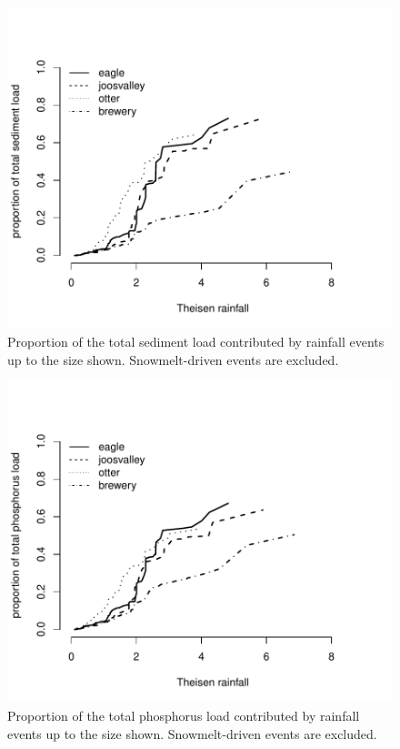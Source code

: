 \documentclass[12pt]{article}
\begin{document}


\begin{figure}
    \begin{center}
\includegraphics{loadings-figure2}
    \end{center}
    \caption{Proportion of the total sediment load contributed by rainfall events up to the size shown. Snowmelt-driven events are excluded.\label{cdf-p}}
\end{figure}

\begin{figure}
    \begin{center}
\includegraphics{loadings-figure3}
    \end{center}
    \caption{Proportion of the total phosphorus load contributed by rainfall events up to the size shown. Snowmelt-driven events are excluded.\label{cdf-s}}
\end{figure}
\end{document}
